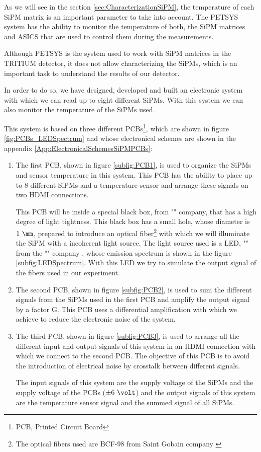 As we will see in the section \ref{sec:CharacterizationSiPM}, the temperature of each SiPM matrix is an important parameter to take into account. The PETSYS system has the ability to monitor the temperature of both, the SiPM matrices and ASICS that are used to control them during the measurements.

Although PETSYS is the system used to work with SiPM matrices in the TRITIUM detector, it does not allow characterizing the SiPMs, which is an important task to understand the results of our detector.

In order to do so, we have designed, developed and built an electronic system with which we can read up to eight different SiPMs. With this system we can also monitor the temperature of the SiPMs used.

This system is based on three different PCBs\footnote{PCB, Printed Circuit Board}, which are shown in figure \ref{fig:PCBs_LEDSpectrum} and whose electronical schemes are shown in the appendix \ref{App:ElectronicalSchemesSiPMPCBs}:

\begin{enumerate}
\item{} The first PCB, shown in figure \ref{subfig:PCB1}, is used to organize the SiPMs and sensor temperature in this system. This PCB has the ability to place up to 8 different SiPMs and a temperature sensor and arrange these signals on two HDMI connections.

This PCB will be inside a special black box, from "" company, that has a high degree of light tightness. This black box has a small hole, whose diameter is $1~\mm$, prepared to introduce an optical fiber\footnote{The optical fibers used are BCF-98 from Saint Gobain company \cite{OpticalFibers}} with which we will illuminate the SiPM with a incoherent light source. The light source used is a LED, "" from the "" company \cite{}, whose emission spectrum is shown in the figure \ref{subfig:LEDSpectrum}. With this LED we try to simulate the output signal of the fibers used in our experiment.

\item{} The second PCB, shown in figure \ref{subfig:PCB2}, is used to sum the different signals from the SiPMs used in the first PCB and amplify the output signal by a factor G. This PCB uses a differential amplification with which we achieve to reduce the electronic noise of the system.

\item{} The third PCB, shown in figure \ref{subfig:PCB3}, is used to arrange all the different input and output signals of this system in an HDMI connection with which we connect to the second PCB. The objective of this PCB is to avoid the introduction of electrical noise by crosstalk between different signals.

The input signals of this system are the supply voltage of the SiPMs and the supply voltage of the PCBs ($\pm 6~\volt$) and the output signals of this system are the temperature sensor signal and the summed signal of all SiPMs. 

\end{enumerate}

